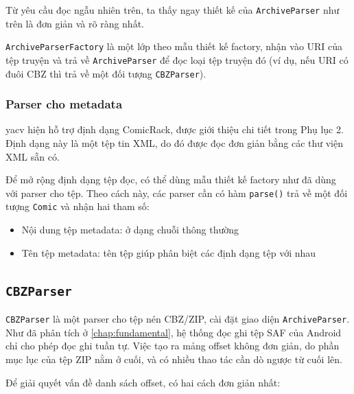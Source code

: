 \documentclass[../../../../thesis]{subfiles}
\begin{document}
Từ yêu cầu đọc ngẫu nhiên trên, ta thấy ngay thiết kế của \texttt{ArchiveParser}
như trên là đơn giản và rõ ràng nhất.

\texttt{ArchiveParserFactory} là một lớp theo mẫu thiết kế factory, nhận
vào URI của tệp truyện và trả về \texttt{ArchiveParser} để đọc loại tệp truyện
đó (ví dụ, nếu URI có đuôi CBZ thì trả về một đối tượng \texttt{CBZParser}).

\subsubsection{Parser cho metadata}

yacv hiện hỗ trợ định dạng ComicRack, được giới thiệu chi tiết trong Phụ lục 2.
Định dạng này là một tệp tin XML, do đó được đọc đơn giản bằng các thư viện XML
sẵn có.

Để mở rộng định dạng tệp đọc, có thể dùng mẫu thiết kế factory như đã dùng với
parser cho tệp. Theo cách này, các parser cần có hàm \texttt{parse()} trả về một
đối tượng \texttt{Comic} và nhận hai tham số:

\begin{itemize}
    \item
        Nội dung tệp metadata: ở dạng chuỗi thông thường
    \item
        Tên tệp metadata: tên tệp giúp phân biệt các định dạng tệp với nhau
\end{itemize}



\subsection{\texttt{CBZParser}}\label{sec:cbzparser_design}

\texttt{CBZParser} là một parser cho tệp nén CBZ/ZIP, cài đặt giao diện
\texttt{ArchiveParser}. Như đã phân tích ở \autoref{chap:fundamental}, hệ thống
đọc ghi tệp SAF của Android chỉ cho phép đọc ghi tuần tự. Việc tạo ra mảng
offset không đơn giản, do phần mục lục của tệp ZIP nằm ở cuối, và có nhiều thao
tác cần dò ngược từ cuối lên.

Để giải quyết vấn đề danh sách offset, có hai cách đơn giản nhất:
\end{document}
